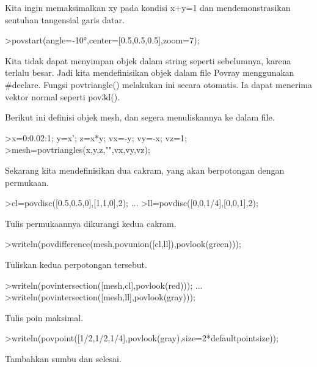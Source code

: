 \documentclass{article}
\begin{document}
\begin{eulernotebook}
\begin{eulercomment}
\begin{eulercomment}
\begin{eulercomment}
\begin{eulercomment}
\begin{eulercomment}
\begin{eulercomment}
\begin{eulercomment}
\begin{eulercomment}
\begin{eulercomment}
\begin{eulercomment}
\begin{eulercomment}
\begin{eulercomment}
\begin{eulercomment}
\begin{eulercomment}
\begin{eulercomment}
\begin{eulercomment}
\begin{eulercomment}
Kita ingin memaksimalkan xy pada kondisi x+y=1 dan mendemonstrasikan
sentuhan tangensial garis datar.
\end{eulercomment}
\begin{eulerprompt}
>povstart(angle=-10°,center=[0.5,0.5,0.5],zoom=7);
\end{eulerprompt}
\begin{eulercomment}
Kita tidak dapat menyimpan objek dalam string seperti sebelumnya,
karena terlalu besar. Jadi kita mendefinisikan objek dalam file Povray
menggunakan #declare. Fungsi povtriangle() melakukan ini secara
otomatis. Ia dapat menerima vektor normal seperti pov3d().

Berikut ini definisi objek mesh, dan segera menuliskannya ke dalam
file.
\end{eulercomment}
\begin{eulerprompt}
>x=0:0.02:1; y=x'; z=x*y; vx=-y; vy=-x; vz=1;
>mesh=povtriangles(x,y,z,"",vx,vy,vz);
\end{eulerprompt}
\begin{eulercomment}
Sekarang kita mendefinisikan dua cakram, yang akan berpotongan dengan
permukaan.
\end{eulercomment}
\begin{eulerprompt}
>cl=povdisc([0.5,0.5,0],[1,1,0],2); ...
>ll=povdisc([0,0,1/4],[0,0,1],2);
\end{eulerprompt}
\begin{eulercomment}
Tulis permukaannya dikurangi kedua cakram.
\end{eulercomment}
\begin{eulerprompt}
>writeln(povdifference(mesh,povunion([cl,ll]),povlook(green)));
\end{eulerprompt}
\begin{eulercomment}
Tuliskan kedua perpotongan tersebut.
\end{eulercomment}
\begin{eulerprompt}
>writeln(povintersection([mesh,cl],povlook(red))); ...
>writeln(povintersection([mesh,ll],povlook(gray)));
\end{eulerprompt}
\begin{eulercomment}
Tulis poin maksimal.
\end{eulercomment}
\begin{eulerprompt}
>writeln(povpoint([1/2,1/2,1/4],povlook(gray),size=2*defaultpointsize));
\end{eulerprompt}
\begin{eulercomment}
Tambahkan sumbu dan selesai.
\end{eulercomment}

\end{eulercomment}
\end{eulercomment}
\end{eulercomment}
\end{eulercomment}
\end{eulercomment}
\end{eulercomment}
\end{eulercomment}
\end{eulercomment}
\end{eulercomment}
\end{eulercomment}
\end{eulercomment}
\end{eulercomment}
\end{eulercomment}
\end{eulercomment}
\end{eulercomment}
\end{eulercomment}
\end{eulernotebook}
\end{document}
